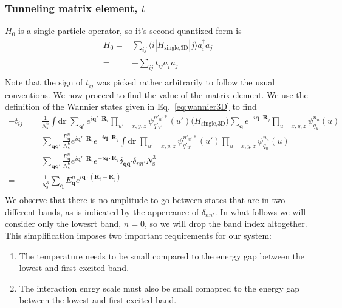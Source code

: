 \documentclass[11pt,letter]{article}
\newcommand{\bv}[1]{\ensuremath{\bm{#1}}}
\begin{document}
\subsubsection{Tunneling matrix element, $t$}
$H_{0}$ is a single particle operator, so it's second quantized form is 
\begin{equation}
\begin{split}
  H_{0} = & \sum_{ij} \langle i| H_{\text{single,3D}} |j \rangle a_{i}^{\dagger} a_{j} \\
        = & -\sum_{ij} t_{ij}  a_{i}^{\dagger} a_{j} \\
\end{split}
\end{equation}  
Note that the sign of $t_{ij}$ was picked rather arbitrarily to follow the
usual conventions.  We now proceed to find the value of the matrix element.
We use the definition of the Wannier states given in Eq.~\ref{eq:wannier3D} to
find 
\begin{equation}
\begin{split}
-t_{ij}  
= & 
  \frac{1}{N_{\mathrm{s}}^{6}}\int \mathrm{d}\bv{r}\ 
     \sum_{\bv{q}'} e^{i \bv{q'}\cdot\bv{R}_{i} }
     \prod_{u'=x,y,z}  \psi_{q'_{u'}}^{n'_{u'}*}(u') 
  \Big( H_{\text{single,3D}}  \Big)
     \sum_{\bv{q}} e^{-i \bv{q}\cdot\bv{R}_{j} }
     \prod_{u=x,y,z}  \psi_{q_{u}}^{n_{u}}(u)\\ 
= &
  \sum_{\bv{q}\bv{q}'}   
  \frac{E_{\bv{q}}^{n}}{N_{\mathrm{s}}^{6}}
   e^{ i \bv{q}'\cdot\bv{R}_{i} }  e^{ -i \bv{q}\cdot\bv{R}_{j} }
   \int\mathrm{d}\bv{r}\ 
     \prod_{u'=x,y,z}  \psi_{q'_{u'}}^{n'_{u'}*}(u') 
     \prod_{u=x,y,z}  \psi_{q_{u}}^{n_{u}}(u) \\ 
= &
  \sum_{\bv{q}\bv{q}'}   
  \frac{E_{\bv{q}}^{n}}{N_{\mathrm{s}}^{6}}
   e^{ i \bv{q}'\cdot\bv{R}_{i} }  e^{ -i \bv{q}\cdot\bv{R}_{j} }
   \delta_{\bv{q}\bv{q}'} \delta_{nn'} N_{\mathrm{s}}^{3} \\
= &
  \frac{1}{N_{\mathrm{s}}^{3}}
  \sum_{\bv{q}}   E_{\bv{q}}^{n}
   e^{ i \bv{q}\cdot(\bv{R}_{i} - \bv{R}_{j}) } \\
\end{split} 
\end{equation}
We observe that there is no amplitude to go between states that are in two different bands, as is indicated by the appereance of $\delta_{nn'}$.   In what follows we will consider only the lowesrt band, $n=0$,  so we will drop the band index altogether.  This simplification imposes two important requirements for our system:
\begin{enumerate}
\item The temperature needs to be small compared to the energy gap between the lowest and first excited band.   
\item The interaction enrgy scale must also be small comapred to the energy gap between the lowest and first excited band. 
\end{enumerate}
\end{document}
